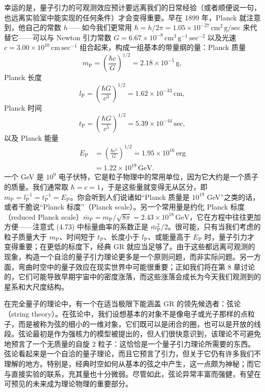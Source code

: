 幸运的是，量子引力的可观测效应预计要远离我们的日常经验（或者顺便说一句，也远离实验室中能实现的任何条件）才会变得重要。早在 1899 年，Planck 就注意到，他自己的常数 $h$——如今我们更常用 $\hbar = h/2\pi = 1.05\times10^{-27}\,\mathrm{cm}^2\,\mathrm{g/sec}$ 来代替它——可以与 Newton 引力常数 $G = 6.67\times10^{-8}\,\mathrm{cm}^3\,\mathrm{g}^{-1}\,\mathrm{sec}^{-2}$ 以及光速 $c = 3.00\times10^{10}\,\mathrm{cm}\,\mathrm{sec}^{-1}$ 组合起来，构成一组基本的带量纲的量：Planck 质量
\begin{equation*}
m_{\mathrm{P}} = \left(\frac{\hbar c}{G}\right)^{1/2} = 2.18\times 10^{-5}\,\mathrm{g},
\tag{4.91}
\end{equation*}
Planck 长度
\begin{equation*}
l_{\mathrm{P}} = \left(\frac{\hbar G}{c^3}\right)^{1/2} = 1.62\times 10^{-33}\,\mathrm{cm},
\tag{4.92}
\end{equation*}
Planck 时间
\begin{equation*}
t_{\mathrm{P}} = \left(\frac{\hbar G}{c^5}\right)^{1/2} = 5.39\times 10^{-44}\,\mathrm{sec},
\tag{4.93}
\end{equation*}
以及 Planck 能量
\begin{align*}
E_{\mathrm{P}} &= \left(\frac{\hbar c^5}{G}\right)^{1/2} = 1.95\times 10^{16}\,\mathrm{erg} \tag{4.94}\\
&= 1.22\times 10^{19}\,\mathrm{GeV}. \tag{4.95}
\end{align*}
一个 GeV 是 $10^9$ 电子伏特，它是粒子物理中的常用单位，因为它大约是一个质子的质量。我们通常取 $\hbar = c = 1$，于是这些量就变得无从区分，即 $m_{\mathrm{P}} = l_{\mathrm{P}}^{-1} = t_{\mathrm{P}}^{-1} = E_{\mathrm{P}}$。你会听到人们说诸如“Planck 质量是 $10^{19}$ GeV”之类的话，或者干脆说“Planck 标度”（Planck scale）。另一个常用量是约化 Planck 标度（reduced Planck scale）$\bar{m}_{\mathrm{P}} = m_{\mathrm{P}}/\sqrt{8\pi} = 2.43\times10^{18}\,\mathrm{GeV}$，它在方程中往往更加方便——注意式 (4.73) 中标量曲率的系数正是 $\bar{m}_{\mathrm{P}}^2/2$。很可能，只有当我们考虑的粒子质量大于 $m_{\mathrm{P}}$、时间短于 $t_{\mathrm{P}}$、长度小于 $l_{\mathrm{P}}$、或能量高于 $E_{\mathrm{P}}$ 时，量子引力才变得重要；在更低的标度下，经典 GR 就应当足够了。由于这些都远离可观测的现象，构造一个自洽的量子引力理论更多是一个原则问题，而非实际问题。另一方面，弯曲时空中的量子效应在现实世界中可能很重要；正如我们将在第 8 章讨论的，它们可能导致早期宇宙中的密度涨落，而这些涨落会成长为今天我们观测到的星系和大尺度结构。

在完全量子的理论中，有一个在适当极限下能涵盖 GR 的领先候选者：弦论（string theory）。在弦论中，我们设想基本的对象不是像电子或光子那样的点粒子，而是被称为弦的细小的一维对象，它们既可以是闭合的圈，也可以是开放的线段。弦论最初是作为强核力的模型被提出的，但人们很快意识到，该理论不可避免地预言了一个无质量的自旋 2 粒子：这恰恰是一个量子引力理论所需要的东西。弦论看起来是一个自洽的量子理论，而且它预言了引力，但关于它仍有许多我们不理解的地方。特别是，经典时空如何从基本的弦之中产生，这一点颇为神秘；而它与直接实验的联系，充其量也十分微弱。尽管如此，弦论异常丰富而强健，有望在可预见的未来成为理论物理的重要部分。

